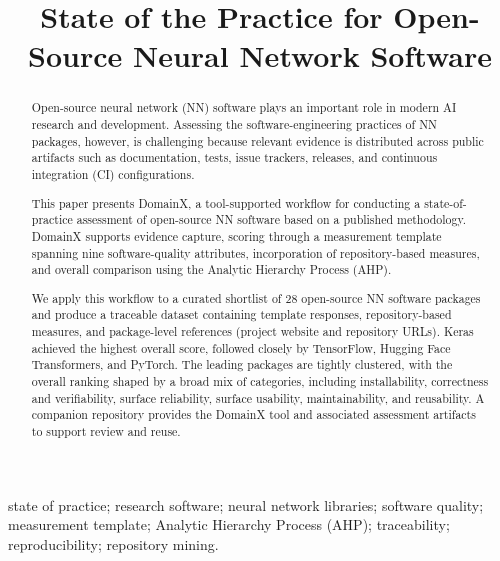 \documentclass[final,1p,times,authoryear,12pt]{elsarticle}
\providecommand{\wss}[1]{\textcolor{blue}{\textit{#1}}}
\begin{document}
\begin{frontmatter}

\title{State of the Practice for Open-Source Neural Network Software}
\address{Department of Computing and Software \\
McMaster University \\
Hamilton, Ontario, Canada}

\begin{abstract}

Open-source neural network (NN) software plays an important
role in modern AI research and development. Assessing the
software-engineering practices of NN packages, however, is
challenging because relevant evidence is distributed across
public artifacts such as documentation, tests, issue trackers,
releases, and continuous integration (CI) configurations.

This paper presents DomainX, a tool-supported workflow for
conducting a state-of-practice assessment of open-source NN
software based on a published methodology. DomainX supports
evidence capture, scoring through a measurement template
spanning nine software-quality attributes, incorporation of
repository-based measures, and overall comparison using the
Analytic Hierarchy Process (AHP).

We apply this workflow to a curated shortlist of 28
open-source NN software packages and produce a traceable
dataset containing template responses, repository-based
measures, and package-level references (project website and
repository URLs). Keras achieved the highest overall score, followed closely
by TensorFlow, Hugging Face Transformers, and PyTorch. The
leading packages are tightly clustered, with the overall
ranking shaped by a broad mix of categories, including
installability, correctness and verifiability, surface
reliability, surface usability, maintainability, and
reusability.
A companion repository provides the DomainX tool and
associated assessment artifacts to support review and reuse.

\end{abstract}

\begin{keyword}
state of practice; research software; neural network libraries; software quality;
measurement template; Analytic Hierarchy Process (AHP); traceability; reproducibility; repository mining.
\end{keyword}

\end{frontmatter}
\end{document}
